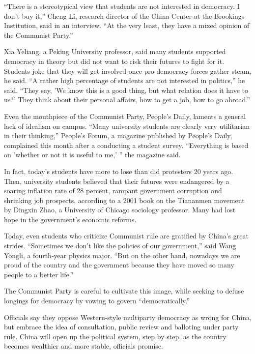 \documentclass[12pt,a4paper,onecolumn]{article}
\begin{document}
``There is a stereotypical view that students are not interested in democracy. I don't buy it,''
Cheng Li, research director of the China Center at the Brookings Institution, said in an interview.
``At the very least, they have a mixed opinion of the Communist Party.''

Xia Yeliang, a Peking University professor, said many students supported democracy in theory but did
not want to risk their futures to fight for it. Students joke that they will get involved once
pro-democracy forces gather steam, he said. ``A rather high percentage of students are not
interested in politics,'' he said. ``They say, 'We know this is a good thing, but what relation does
it have to us?' They think about their personal affairs, how to get a job, how to go abroad.''

Even the mouthpiece of the Communist Party, People's Daily, laments a general lack of idealism on
campus. ``Many university students are clearly very utilitarian in their thinking,'' People's Forum,
a magazine published by People's Daily, complained this month after a conducting a student survey.
``Everything is based on 'whether or not it is useful to me,' '' the magazine said.

In fact, today's students have more to lose than did protesters 20 years ago. Then, university
students believed that their futures were endangered by a soaring inflation rate of 28 percent,
rampant government corruption and shrinking job prospects, according to a 2001 book on the Tiananmen
movement by Dingxin Zhao, a University of Chicago sociology professor. Many had lost hope in the
government's economic reforms.

Today, even students who criticize Communist rule are gratified by China's great strides.
``Sometimes we don't like the policies of our government,'' said Wang Yongli, a fourth-year physics
major. ``But on the other hand, nowadays we are proud of the country and the government because they
have moved so many people to a better life.''

The Communist Party is careful to cultivate this image, while seeking to defuse longings for
democracy by vowing to govern ``democratically.''

Officials say they oppose Western-style multiparty democracy as wrong for China, but embrace the
idea of consultation, public review and balloting under party rule. China will open up the political
system, step by step, as the country becomes wealthier and more stable, officials promise.
\end{document}
